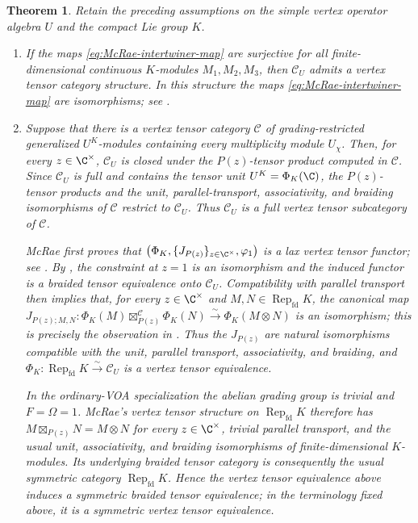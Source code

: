 \documentclass[12pt,leqno]{amsart}
\numberwithin{equation}{section} \newtheorem{thm}{Theorem}[section] \newtheorem{lem}[thm]{Lemma} \newtheorem{ex}[thm]{Example} \newtheorem{prop}[thm]{Proposition} \newtheorem{cor}[thm]{Corollary} \newtheorem{defi}[thm]{Definition} \newtheorem{rmk}[thm]{Remark} \newtheorem{notation}[thm]{Notation}
\newcommand{\Rep}{\operatorname{Rep}}
\begin{document}
\begin{thm}
\label{thm:McRae-VOA-orbifold}
Retain the preceding assumptions on the simple vertex operator algebra $U$ and the compact Lie group $K$.

\begin{enumerate}[label=\textnormal{(\roman*)}]
\item
If the maps \eqref{eq:McRae-intertwiner-map} are surjective for all finite-dimensional continuous $K$-modules $M_1,M_2,M_3$, then $\mathcal C_U$ admits a vertex tensor category structure. In this structure the maps \eqref{eq:McRae-intertwiner-map} are isomorphisms; see \cite[Theorem~4.1]{McRae}.

\item
Suppose that there is a vertex tensor category $\mathcal C$ of grading-restricted generalized $U^K$-modules containing every multiplicity module $U_\chi$. Then, for every $z\in\C^\times$, $\mathcal C_U$ is closed under the $P(z)$-tensor product computed in $\mathcal C$. Since $\mathcal C_U$ is full and contains the tensor unit $U^K=\Phi_K(\C)$, the $P(z)$-tensor products and the unit, parallel-transport, associativity, and braiding isomorphisms of $\mathcal C$ restrict to $\mathcal C_U$. Thus $\mathcal C_U$ is a full vertex tensor subcategory of $\mathcal C$.

McRae first proves that \(\bigl(\Phi_K,\{J_{P(z)}\}_{z\in\C^\times},\varphi_1\bigr)\) is a lax vertex tensor functor; see \cite[Theorem~4.5]{McRae}. By \cite[Corollary~4.8]{McRae}, the constraint at $z=1$ is an isomorphism and the induced functor is a braided tensor equivalence onto $\mathcal C_U$. Compatibility with parallel transport then implies that, for every $z\in\C^\times$ and $M,N\in\Rep_{\mathrm{fd}}K$, the canonical map \(J_{P(z);M,N}: \Phi_K(M)\boxtimes^{\mathcal C}_{P(z)}\Phi_K(N) \overset{\sim}{\longrightarrow} \Phi_K(M\otimes N)\) is an isomorphism; this is precisely the observation in \cite[Remark~4.10]{McRae}. Thus the $J_{P(z)}$ are natural isomorphisms compatible with the unit, parallel transport, associativity, and braiding, and \(\Phi_K:\Rep_{\mathrm{fd}}K\overset{\sim}{\longrightarrow}\mathcal C_U\) is a vertex tensor equivalence.

In the ordinary-VOA specialization the abelian grading group is trivial and $F=\Omega=1$. McRae's vertex tensor structure on $\Rep_{\mathrm{fd}}K$ therefore has \(M\boxtimes_{P(z)}N=M\otimes N\) for every $z\in\C^\times$, trivial parallel transport, and the usual unit, associativity, and braiding isomorphisms of finite-dimensional $K$-modules. Its underlying braided tensor category is consequently the usual symmetric category $\Rep_{\mathrm{fd}}K$. Hence the vertex tensor equivalence above induces a symmetric braided tensor equivalence; in the terminology fixed above, it is a symmetric vertex tensor equivalence.


\end{enumerate}
\end{thm}
\end{document}
